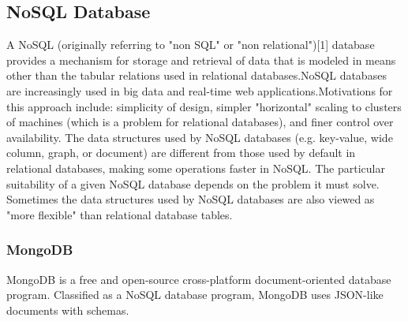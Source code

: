 \subsection{NoSQL Database}
A NoSQL (originally referring to "non SQL" or "non relational")[1] database provides a mechanism for storage and retrieval of data that is modeled in means other than the tabular relations used in relational databases.NoSQL databases are increasingly used in big data and real-time web applications.Motivations for this approach include: simplicity of design, simpler "horizontal" scaling to clusters of machines (which is a problem for relational databases), and finer control over availability. The data structures used by NoSQL databases (e.g. key-value, wide column, graph, or document) are different from those used by default in relational databases, making some operations faster in NoSQL. The particular suitability of a given NoSQL database depends on the problem it must solve. Sometimes the data structures used by NoSQL databases are also viewed as "more flexible" than relational database tables.

\subsubsection{MongoDB}
MongoDB is a free and open-source cross-platform document-oriented database program. Classified as a NoSQL database program, MongoDB uses JSON-like documents with schemas.


